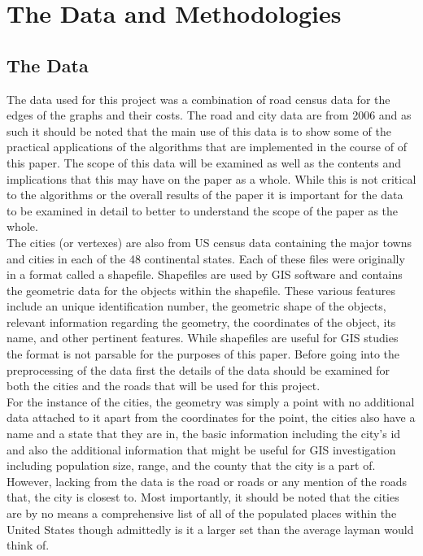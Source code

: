 \documentclass[midd]{thesis}
\newcommand{\tab}{\hspace*{2em}}
\begin{document}
\chapter{The Data and Methodologies}
\section{The Data}
\tab The data used for this project was a combination of road census data for the edges of the graphs and their costs. The road and city data are from 2006 and as such it should be noted that the main use of this data is to show some of the practical applications of the algorithms that are implemented in the course of of this paper. The scope of this data will be examined as well as the contents and implications that this may have on the paper as a whole. While this is not critical to the algorithms or the overall results of the paper it is important for the data to be examined in detail to better to understand the scope of the paper as the whole.\\
\tab The cities (or vertexes) are also from US census data containing the major towns and cities in each of the 48 continental states.  Each of these files were originally in a format called a shapefile. Shapefiles are used by GIS software and contains the geometric data for the objects within the shapefile. These various features include an unique identification number, the geometric shape of the objects, relevant information regarding the geometry, the coordinates of the object, its name, and other pertinent features. While shapefiles are useful for GIS studies the format is not parsable for the purposes of this paper. Before going into the preprocessing of the data first the details of the data should be examined for both the cities and the roads that will be used for this project.\\
\tab For the instance of the cities, the geometry was simply a point with no additional data attached to it apart from the coordinates for the point, the cities also have a name and a state that they are in, the basic information including the city's id and also the additional information that might be useful for GIS investigation including population size, range, and the county that the city is a part of. However, lacking from the data is the road or roads or any mention of the roads that, the city is closest to. Most importantly, it should be noted that the cities are by no means a comprehensive list of all of the populated places within the United States though admittedly is it a larger set than the average layman would think of.\\
\end{document}
